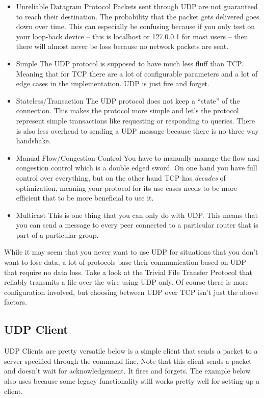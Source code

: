 \begin{itemize}
  \tightlist
\item Unreliable Datagram Protocol
  Packets sent through UDP are not guaranteed to reach their destination.
  The probability that the packet gets delivered goes down over time.
  This can especially be confusing because if you only test on your loop-back device -- this is localhost or 127.0.0.1 for most users -- then there will almost never be loss because no network packets are sent.
\item Simple
  The UDP protocol is supposed to have much less fluff than TCP.
  Meaning that for TCP there are a lot of configurable parameters and a lot of edge cases in the implementation.
  UDP is just fire and forget.
\item Stateless/Transaction
  The UDP protocol does not keep a ``state'' of the connection.
  This makes the protocol more simple and let's the protocol represent simple transactions like requesting or responding to queries.
  There is also less overhead to sending a UDP message because there is no three way handshake.
\item Manual Flow/Congestion Control
  You have to manually manage the flow and congestion control which is a double edged sword.
  On one hand you have full control over everything, but on the other hand TCP has \textit{decades} of optimization, meaning your protocol for its use cases needs to be more efficient that to be more beneficial to use it.
\item Multicast
  This is one thing that you can only do with UDP.
  This means that you can send a message to every peer connected to a particular router that is part of a particular group.
\end{itemize}


While it may seem that you never want to use UDP for situations that you don't want to lose data, a lot of protocols base their communication based on UDP that require no data loss.
Take a look at the Trivial File Transfer Protocol that reliably transmits a file over the wire using UDP only.
Of course there is more configuration involved, but choosing between UDP over TCP isn't just the above factors.

\subsection{UDP Client}

UDP Clients are pretty versatile below is a simple client that sends a packet to a server specified through the command line.
Note that this client sends a packet and doesn't wait for acknowledgement.
It fires and forgets.
The example below also uses  because some legacy functionality still works pretty well for setting up a client.

